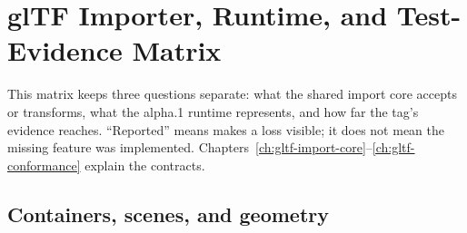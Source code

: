 \chapter{glTF Importer, Runtime, and Test-Evidence Matrix}
\label{ch:gltf-evidence-matrix}

This matrix keeps three questions separate: what the shared import core accepts or transforms,
what the alpha.1 runtime represents, and how far the tag's evidence reaches. ``Reported'' means
 makes a loss visible; it does not mean the missing feature was
implemented. Chapters~\ref{ch:gltf-import-core}--\ref{ch:gltf-conformance} explain the contracts.

\section{Containers, scenes, and geometry}

